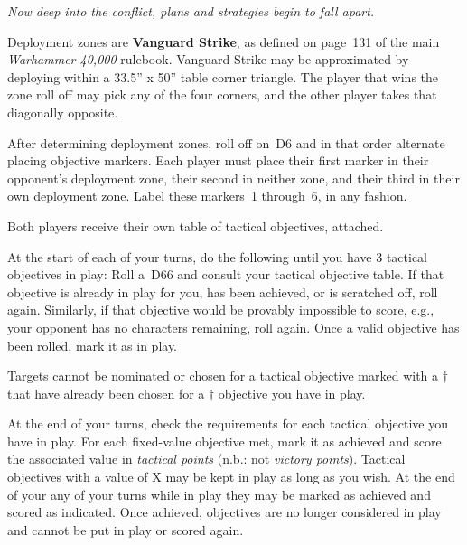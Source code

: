 \clearpage
{}

\centerline{\emph{Now deep into the conflict, plans and strategies
    begin to fall apart.}}


Deployment zones are \textbf{Vanguard Strike}, as defined on page~131
of the main \emph{Warhammer 40,000} rulebook.  Vanguard Strike may be
approximated by deploying within a 33.5'' x 50'' table corner
triangle.  The player that wins the zone roll off may pick any of the
four corners, and the other player takes that diagonally opposite.

\bigskip%
After determining deployment zones, roll off on~D6 and in that order
alternate placing objective markers.  Each player must place their
first marker in their opponent's deployment zone, their second in
neither zone, and their third in their own deployment zone.  Label
these markers~1 through~6, in any fashion.

\bigskip%
Both players receive their own table of tactical objectives, attached.



At the start of each of your turns, do the following until you have 3
tactical objectives in play: Roll a~D66 and consult your tactical
objective table.  If that objective is already in play for you, has
been achieved, or is scratched off, roll again.  Similarly, if that
objective would be provably impossible to score, e.g., your opponent
has no characters remaining, roll again.  Once a valid objective has
been rolled, mark it as in play.

Targets cannot be nominated or chosen for a tactical objective marked
with a $\dagger$ that have already been chosen for a $\dagger$
objective you have in play.

\smallskip
At the end of your turns, check the requirements for each tactical
objective you have in play.  For each fixed-value objective met, mark
it as achieved and score the associated value in \emph{tactical
  points} (n.b.: not \emph{victory points}).  Tactical objectives with
a value of X may be kept in play as long as you wish.  At the end of
your any of your turns while in play they may be marked as achieved
and scored as indicated.  Once achieved, objectives are no longer
considered in play and cannot be put in play or scored again.

